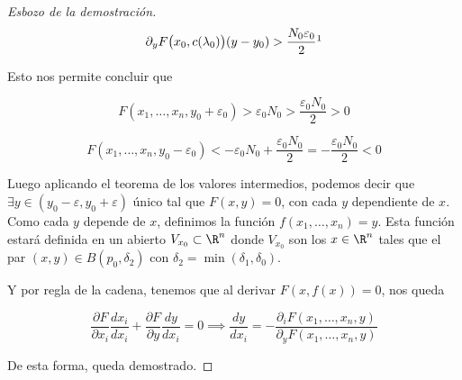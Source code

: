 \begin{proof}[Esbozo de la demostración]
    \[
    \partial_y F\big( x_0, c(\lambda_0) \big)(y - y_0) > \frac{N_0 \varepsilon_0}{2} \footnotemark
    \]
    
    Esto nos permite concluir que
    
    \[
    F(x_1, \dots, x_n, y_0 + \varepsilon_0) > \varepsilon_0N_0 > \frac{\varepsilon_0N_0}{2} > 0
    \]
    
    \[
    F(x_1, \dots, x_n, y_0 - \varepsilon_0) < -\varepsilon_0N_0 + \frac{\varepsilon_0N_0}{2} = -\frac{\varepsilon_0N_0}{2}< 0
    \]
    
    Luego aplicando el teorema de los valores intermedios, podemos decir que $\exists y \in (y_0 - \varepsilon, y_0 + \varepsilon)$ único tal que $F(x,y) = 0$, con cada $y$ dependiente de $x$. Como cada $y$ depende de $x$, definimos la función $f(x_1, \dots, x_n) = y$. Esta función estará definida en un abierto $V_{x_0} \subset \R^n$ donde $V_{x_0}$ son los $x \in \R^n$ tales que el par $(x, y) \in B(p_0, \delta_2)$ con $\delta_2 = \min(\delta_1, \delta_0)$.
    
    Y por regla de la cadena, tenemos que al derivar $F\left(x, f(x)\right) = 0$, nos queda
    
    \[
    \frac{\partial F}{\partial x_i} \frac{dx_i}{dx_i} + \frac{\partial F}{\partial y} \frac{dy}{dx_i} = 0 \implies \frac{dy}{dx_i} = -\dfrac{\partial_i F(x_1, \dots, x_n, y)}{\partial_y F(x_1, \dots, x_n, y)}
    \]
    
    De esta forma, queda demostrado.
\end{proof}

